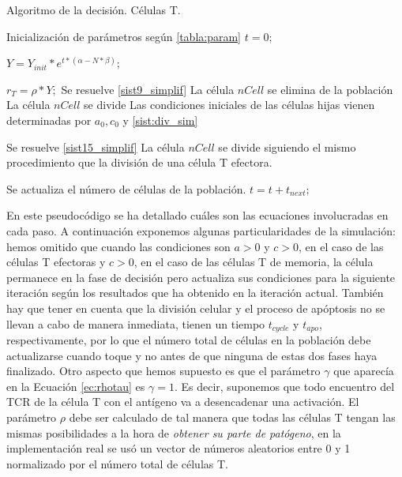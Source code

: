 \begin{algorithm}
	\caption{Algoritmo de la decisión. Células T.}
	\label{algo:pseudocodigo}
	\begin{algorithmic}[1]
		
		
		\State Inicialización de parámetros según \ref{tabla:param}
		\State $t = 0;$ 
		
		  
		\State $Y = Y_{init}*e^{t*(\alpha - N*\beta)};$ 
		
		 
			\State $ r_{T}=\rho*Y;$ 
			 
				\State Se resuelve \ref{sist9_simplif}
					\State La célula $nCell$ se elimina de la población
					\State La célula $nCell$ se divide
					\State Las condiciones iniciales de las células hijas vienen determinadas por $a_0, c_0$ y \ref{sist:div_sim}
				\EndIf
			
			 
				\State Se resuelve \ref{sist15_simplif}
					\State La célula $nCell$ se divide siguiendo el mismo procedimiento que la división de una célula T efectora. 
				\EndIf
			\EndIf
		\EndFor
		
		\State Se actualiza el número de células de la población.
		\State $t = t + t_{next};$
		
		\EndWhile
		
	\end{algorithmic}
\end{algorithm}

En este pseudocódigo se ha detallado cuáles son las ecuaciones involucradas en cada paso. A continuación exponemos algunas particularidades de la simulación: hemos omitido que cuando las condiciones son $a > 0$ y $c > 0$, en el caso de las células T efectoras y $c > 0$, en el caso de las células T de memoria, la célula permanece en la fase de decisión pero actualiza sus condiciones para la siguiente iteración según los resultados que ha obtenido en la iteración actual. También hay que tener en cuenta que la división celular y el proceso de apóptosis no se llevan a cabo de manera inmediata, tienen un tiempo $t_{cycle}$ y $t_{apo}$, respectivamente, por lo que el número total de células en la población debe actualizarse cuando toque y no antes de que ninguna de estas dos fases haya finalizado. Otro aspecto que hemos supuesto es que el parámetro $\gamma$ que aparecía en la Ecuación \ref{ec:rhotau} es $\gamma = 1$. Es decir, suponemos que todo encuentro del TCR de la célula T con el antígeno va a desencadenar una activación. El parámetro $\rho$ debe ser calculado de tal manera que todas las células T tengan las mismas posibilidades a la hora de \textit{obtener su parte de patógeno}, en la implementación real se usó un vector de números aleatorios entre 0 y 1 normalizado por el número total de células T.

